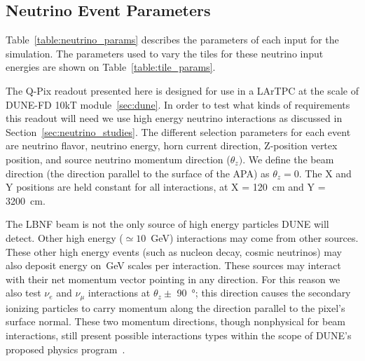 \subsection{Neutrino Event Parameters}
Table~\ref{table:neutrino_params} describes the parameters of each input for the simulation.
The parameters used to vary the tiles for these neutrino input energies are shown on Table~\ref{table:tile_params}.

The Q-Pix readout presented here is designed for use in a LArTPC at the scale of DUNE-FD 10kT module~\ref{sec:dune}.
In order to test what kinds of requirements this readout will need we use high energy neutrino interactions as discussed in Section~\ref{sec:neutrino_studies}.
The different selection parameters for each event are neutrino flavor, neutrino energy, horn current direction, Z-position vertex position, and source neutrino momentum direction ($\theta_{z})$.
We define the beam direction (the direction parallel to the surface of the APA) as $\theta_{z} = 0$.
The X and Y positions are held constant for all interactions, at X = 120~\unit{cm} and Y = 3200~\unit{cm}.

The LBNF beam is not the only source of high energy particles DUNE will detect.
Other high energy ($\simeq 10$~\unit{GeV}) interactions may come from other sources.
These other high energy events (such as nucleon decay, cosmic neutrinos) may also deposit energy on~\unit{GeV} scales per interaction.
These sources may interact with their net momentum vector pointing in any direction.
For this reason we also test $\nu_{e}$ and $\nu_{\mu}$ interactions at $\theta_{z} \pm$ 90~\unit{\degree}; this direction causes the secondary ionizing particles to carry momentum along the direction parallel to the pixel's surface normal.
These two momentum directions, though nonphysical for beam interactions, still present possible interactions types within the scope of DUNE's proposed physics program~\citep{DUNE_TDRv3_Abi_2020}.

